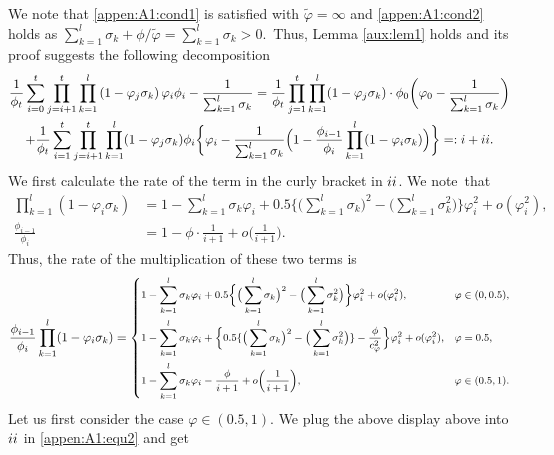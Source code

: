 We note that \eqref{appen:A1:cond1} is satisfied with $\tilde{\varphi}=\infty$ and \eqref{appen:A1:cond2} holds as \mbox{$\sum_{k=1}^l\sigma_k+\phi/\tilde{\varphi}=\sum_{k=1}^l\sigma_k>0$}.~Thus, Lemma \ref{aux:lem1} holds and its proof \cite[(C.1)]{Na2022Statistical} suggests the following decomposition 
\begin{multline}\label{appen:A1:equ2}
\frac{1}{\phi_t} \sum_{i=0}^t \prod_{j=i+1}^t \prod_{k=1}^l\left(1-\varphi_j \sigma_k\right) \varphi_i \phi_i-\frac{1}{\sum_{k=1}^l\sigma_k}=\frac{1}{\phi_t} \prod_{j=1}^t \prod_{k=1}^l (1-\varphi_j\sigma_k)\cdot \phi_0\bigg(\varphi_0-\frac{1}{\sum_{k=1}^{l}\sigma_k}\bigg)\\
+\frac{1}{\phi_t} \sum_{i=1}^t\prod_{j=i+1}^t \prod_{k=1}^l (1-\varphi_j\sigma_k)\phi_i  \bigg\{ \varphi_i-\frac{1}{\sum_{k=1}^{l}\sigma_k}\Big(1-\frac{\phi_{i-1}}{\phi_i}\prod_{k=1}^l(1-\varphi_i\sigma_k)\Big)\bigg\}=: \uppercase\expandafter{\romannumeral1} + \uppercase\expandafter{\romannumeral2}.
\end{multline}
We first calculate the rate of the term in the curly bracket in $\uppercase\expandafter{\romannumeral2}$. We note~that
\begin{align*}
\prod_{k=1}^l(1-\varphi_i\sigma_k) & = 1-\sum_{k=1}^l\sigma_k\varphi_i + 0.5\Big\{\big(\sum_{k=1}^l \sigma_k\big)^2-\big(\sum_{k=1}^l \sigma_k^2\big)\Big\}\varphi_i^2 + o(\varphi_i^2),\\
\frac{\phi_{i-1}}{\phi_i} & = 1-\phi\cdot\frac{1}{i+1}+o\Big(\frac{1}{i+1}\Big).
\end{align*}
Thus, the rate of the multiplication of these two terms is
\begin{equation}\label{pequ:1}
{\footnotesize\frac{\phi_{i-1}}{\phi_i}\prod_{k=1}^l(1-\varphi_i\sigma_k)= 
\begin{dcases}
1 - \sum_{k=1}^l \sigma_k\varphi_i + 0.5\Big\{\big(\sum_{k=1}^l \sigma_k\big)^2-\big(\sum_{k=1}^l \sigma_k^2\big)\Big\}\varphi_i^2 + o(\varphi_i^2), &\varphi\in (0,0.5),\\
1 - \sum_{k=1}^l \sigma_k\varphi_i + \Big\{0.5\{\big(\sum_{k=1}^l \sigma_k\big)^2-\big(\sum_{k=1}^l \sigma_k^2\big)\}-\frac{\phi}{c_{\varphi}^2}\Big\}\varphi_i^2 + o(\varphi_i^2), &\varphi = 0.5,\\
1 -  \sum_{k=1}^l \sigma_k\varphi_i - \frac{\phi}{i+1} + o\Big(\frac{1}{i+1}\Big), &\varphi\in(0.5,1).
\end{dcases}}
\end{equation}
Let us first consider the case $\varphi\in(0.5,1)$. We plug the above display above into $\uppercase\expandafter{\romannumeral2}$ in \eqref{appen:A1:equ2} and get\;\;
